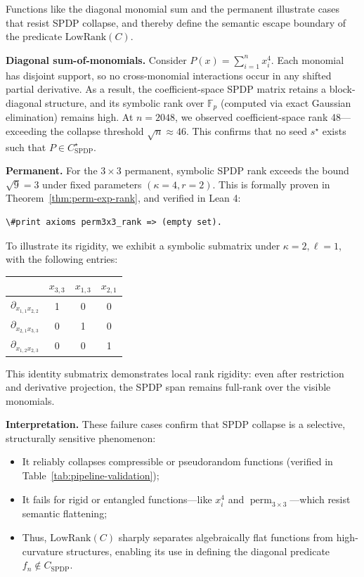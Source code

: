 \documentclass[12pt]{article}
\DeclareMathOperator{\perm}{perm}
\theoremstyle{definition}
\theoremstyle{definition}
\theoremstyle{remark}
\theoremstyle{remark}
\begin{document}
Functions like the diagonal monomial sum and the permanent illustrate cases that resist SPDP collapse, and thereby define the semantic escape boundary of the predicate $\text{LowRank}(C)$.

\textbf{Diagonal sum-of-monomials.} Consider $P(x) = \sum_{i=1}^n x_i^4$. Each monomial has disjoint support, so no cross-monomial interactions occur in any shifted partial derivative. As a result, the coefficient-space SPDP matrix retains a block-diagonal structure, and its symbolic rank over $\mathbb{F}_p$ (computed via exact Gaussian elimination) remains high. At $n = 2048$, we observed coefficient-space rank 48---exceeding the collapse threshold $\sqrt{n} \approx 46$. This confirms that no seed $s^{\star}$ exists such that $P \in C^{\star}_{\text{SPDP}}$.

\textbf{Permanent.} For the $3 \times 3$ permanent, symbolic SPDP rank exceeds the bound $\sqrt{9} = 3$ under fixed parameters $(\kappa = 4, r = 2)$. This is formally proven in Theorem~\ref{thm:perm-exp-rank}, and verified in Lean 4:
\begin{verbatim}
\#print axioms perm3x3_rank => (empty set).
\end{verbatim}

To illustrate its rigidity, we exhibit a symbolic submatrix under $\kappa = 2, \ell = 1$, with the following entries:

\begin{center}
\begin{tabular}{l|ccc}
& $x_{3,3}$ & $x_{1,3}$ & $x_{2,1}$ \\
\hline
$\partial_{x_{1,1}x_{2,2}}$ & 1 & 0 & 0 \\
$\partial_{x_{2,1}x_{3,3}}$ & 0 & 1 & 0 \\
$\partial_{x_{1,2}x_{2,3}}$ & 0 & 0 & 1 \\
\end{tabular}
\end{center}

This identity submatrix demonstrates local rank rigidity: even after restriction and derivative projection, the SPDP span remains full-rank over the visible monomials.

\textbf{Interpretation.} These failure cases confirm that SPDP collapse is a selective, structurally sensitive phenomenon:
\begin{itemize}
\item It reliably collapses compressible or pseudorandom functions (verified in Table~\ref{tab:pipeline-validation});
\item It fails for rigid or entangled functions---like $x_i^4$ and $\perm_{3 \times 3}$---which resist semantic flattening;
\item Thus, $\text{LowRank}(C)$ sharply separates algebraically flat functions from high-curvature structures, enabling its use in defining the diagonal predicate $f_n \notin C_{\text{SPDP}}$.
\end{itemize}
\end{document}
